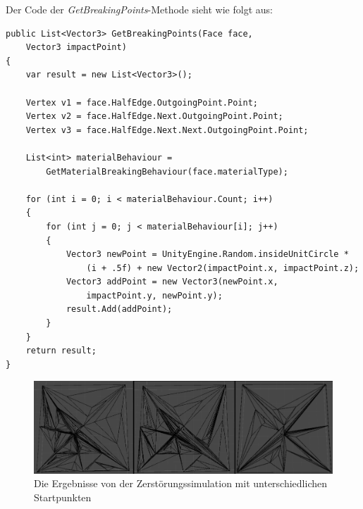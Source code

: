 Der Code der \textit{GetBreakingPoints}-Methode sieht wie folgt aus:
\begin{lstlisting}
public List<Vector3> GetBreakingPoints(Face face,
	Vector3 impactPoint)
{
	var result = new List<Vector3>();
	
	Vertex v1 = face.HalfEdge.OutgoingPoint.Point;
	Vertex v2 = face.HalfEdge.Next.OutgoingPoint.Point;
	Vertex v3 = face.HalfEdge.Next.Next.OutgoingPoint.Point;
	
	List<int> materialBehaviour =
		GetMaterialBreakingBehaviour(face.materialType);
	
	for (int i = 0; i < materialBehaviour.Count; i++)
	{
		for (int j = 0; j < materialBehaviour[i]; j++)
		{
			Vector3 newPoint = UnityEngine.Random.insideUnitCircle *
				(i + .5f) + new Vector2(impactPoint.x, impactPoint.z);
			Vector3 addPoint = new Vector3(newPoint.x,
				impactPoint.y, newPoint.y);
			result.Add(addPoint);
		}
	}
	return result;
}

\end{lstlisting}
\begin{figure}[H]
	\centering
	\includegraphics[width=0.9\linewidth]{Images/DestructionExample}
	\caption{Die Ergebnisse von der Zerst\"orungssimulation mit unterschiedlichen Startpunkten}
	\label{fig:destructionexample}
\end{figure}
